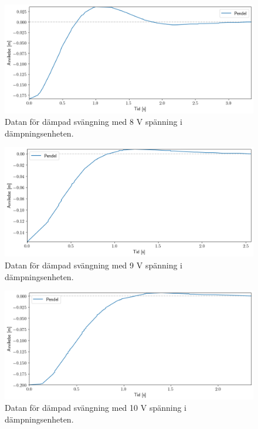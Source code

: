 \documentclass[12pt, a4paper]{article}
\begin{document}
\begin{figure}[hp]
	\includegraphics[width=\textwidth]{graf_8_v_centered}
	\caption{Datan för dämpad svängning med 8 V spänning i dämpningsenheten.}
	\label{fig:data_8_v}
\end{figure}

\begin{figure}[hp]
	\includegraphics[width=\textwidth]{graf_9_v_centered}
	\caption{Datan för dämpad svängning med 9 V spänning i dämpningsenheten.}
	\label{fig:data_9_v}
\end{figure}

\begin{figure}[hp]
	\includegraphics[width=\textwidth]{graf_10_v_centered}
	\caption{Datan för dämpad svängning med 10 V spänning i dämpningsenheten.}
	\label{fig:data_10_v}
\end{figure}
\end{document}

